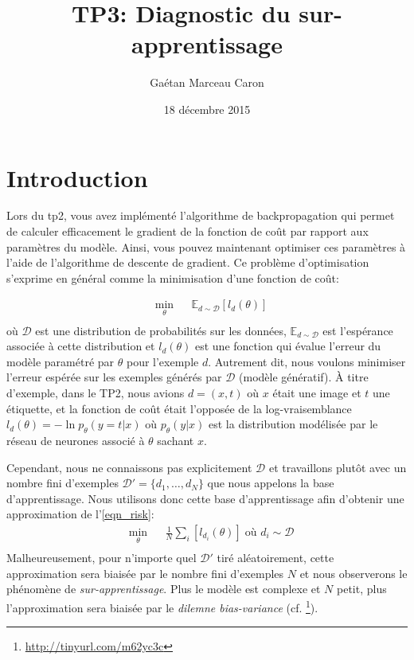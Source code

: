 \documentclass{article}
\title{TP3: Diagnostic du sur-apprentissage}
\author{Gaétan Marceau Caron}
\date{18 décembre 2015}
\begin{document}
\maketitle

\section{Introduction}
Lors du tp2, vous avez implémenté l'algorithme de backpropagation qui permet de calculer efficacement le gradient de la fonction de coût par rapport aux paramètres du modèle.
Ainsi, vous pouvez maintenant optimiser ces paramètres à l'aide de l'algorithme de descente de gradient.
Ce problème d'optimisation s'exprime en général comme la minimisation d'une fonction de coût:

\begin{equation}
\label{eqn_risk}
\begin{aligned}
& \underset{\theta}{\text{min}}
& & \mathbb{E}_{d \sim \mathcal{D}} \left[ l_d(\theta) \right] \\
\end{aligned}
\end{equation}
où $\mathcal{D}$ est une distribution de probabilités sur les données, $\mathbb{E}_{d \sim \mathcal{D}}$ est l'espérance associée à cette distribution et $l_d(\theta)$ est une fonction qui évalue l'erreur du modèle paramétré par $\theta$ pour l'exemple $d$. Autrement dit, nous voulons minimiser l'erreur espérée sur les exemples générés par $\mathcal{D}$ (modèle génératif).
À titre d'exemple, dans le TP2, nous avions $d = (x,t)$ où $x$ était une image et $t$ une étiquette, et la fonction de coût était l'opposée de la log-vraisemblance $l_d(\theta) = -\ln p_\theta(y=t|x)$ où $p_\theta(y|x)$ est la distribution modélisée par le réseau de neurones associé à $\theta$ sachant $x$.

Cependant, nous ne connaissons pas explicitement $\mathcal{D}$ et travaillons plutôt avec un nombre fini d'exemples $\mathcal{D}'=\{d_1, \dots, d_N\}$ que nous appelons la base d'apprentissage.
Nous utilisons donc cette base d'apprentissage afin d'obtenir une approximation de l'\cref{eqn_risk}:
\begin{equation}
\label{eqn_emprisk}
\begin{aligned}
& \underset{\theta}{\text{min}}
& & \frac{1}{N} \sum_i \left[ l_{d_i}(\theta) \right] \; \mbox{où $d_i \sim \mathcal{D}$}\\
\end{aligned}
\end{equation}
Malheureusement, pour n'importe quel $\mathcal{D}'$ tiré aléatoirement, cette approximation sera biaisée par le nombre fini d'exemples $N$ et nous observerons le phénomène de {\it sur-apprentissage}.
Plus le modèle est complexe et $N$ petit, plus l'approximation sera biaisée par le {\em dilemne bias-variance} (cf. \cite[][46]{Bishop:2006} \footnote{\url{http://tinyurl.com/m62yc3c}}).
\end{document}
